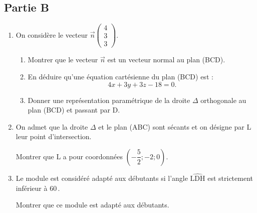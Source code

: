 \documentclass[10pt]{article}
\providecommand{\vect}[1]{\overrightarrow{#1}}
\begin{document}
			\subsection*{Partie B}
		\begin{enumerate}
			\item On considère le vecteur $\vect{n}\begin{pmatrix} 4\\3\\3 \end{pmatrix}$.
			\begin{enumerate}
				\item Montrer que le vecteur $\vect{n}$ est un vecteur normal au plan (BCD).

				\item En déduire qu'une équation cartésienne du plan (BCD) est :
				\[4x+3y+3z-18=0.\]

				\item Donner une représentation paramétrique de la droite $\Delta$ orthogonale au plan (BCD) et passant par D.
			\end{enumerate}


			\item On admet que la droite $\Delta$ et le plan (ABC) sont sécants et on désigne par L leur point d'intersection.

			Montrer que L a pour coordonnées $\left(-\dfrac{5}{2} ; -2 ; 0\right)$.

			\item Le module est considéré adapté aux débutants si l'angle $\widehat{\mathrm{LDH}}$ est strictement inférieur à $60$\,\textdegree{}.

			Montrer que ce module est adapté aux débutants.
		\end{enumerate}
\end{document}
